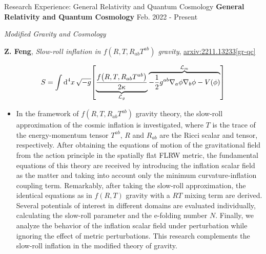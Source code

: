 \documentclass[9pt,aspectratio=169,hyperref=colorlinks]{beamer}
\begin{document}
\begin{frame}{Research Experience: General Relativity and Quantum Cosmology}
    \textbf{General Relativity and Quantum Cosmology} \hfill Feb. 2022 - Present

    \smallskip \quad \textit{Modified Gravity and Cosmology}

    \textbf{Z. Feng}, \textit{Slow-roll inflation in $f\left(R, T, R_{ab}T^{ab}\right)$ gravity}, \href{https://arxiv.org/abs/2211.13233}{arxiv:2211.13233[gr-qc]}

    \[S = \int \dd[4]{x} \sqrt{-g} \qty[\underbrace{\frac{f\qty(R, T, R_{ab}T^{ab})}{2 \kappa}}_{\mathcal{L}_g} \overbrace{- \frac{1}{2} g^{ab} \nabla_{a} \phi \nabla_{b} \phi - V(\phi)}^{\mathcal{L}_m}]\]

    \begin{itemize}
        \item In the framework of $f\left(R, T, R_{ab}T^{ab}\right)$ gravity theory, the slow-roll approximation of the cosmic inflation is investigated, where $T$ is the trace of the energy-momentum tensor $T^{ab}$, $R$ and $R_{ab}$ are the Ricci scalar and tensor, respectively. After obtaining the equations of motion of the gravitational field from the action principle in the spatially flat FLRW metric, the fundamental equations of this theory are received by introducing the inflation scalar field as the matter and taking into account only the minimum curvature-inflation coupling term. Remarkably, after taking the slow-roll approximation, the identical equations as in $f(R, T)$ gravity with a $RT$ mixing term are derived. Several potentials of interest in different domains are evaluated individually, calculating the slow-roll parameter and the e-folding number $N$. Finally, we analyze the behavior of the inflation scalar field under perturbation while ignoring the effect of metric perturbations. This research complements the slow-roll inflation in the modified theory of gravity.
    \end{itemize}
\end{frame}
\end{document}
